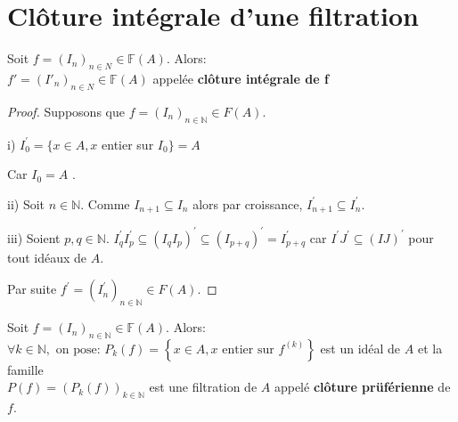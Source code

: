 \section{Clôture intégrale d'une filtration}
\begin{maproposition}
	Soit $f=(I_n)_{n \in N} \in \mathbb{F}(A).$ Alors:\\
	$f'=(I'_n)_{n \in N} \in \mathbb{F}(A)$ appelée \textbf{clôture intégrale de f}
\end{maproposition}
\begin{proof}
	Supposons que $f=(I_{n})_{n\in \mathbb{N}}\in F(A).$
	
	i) $I_{0}^{\prime }=\{x\in A,x$ entier sur $I_{0}\}=A$
	
	Car $I_{0}=A$ $.$
	
	ii) Soit $n\in \mathbb{N}.$
	Comme $I_{n+1}\subseteq I_{n}$ alors par croissance, $I_{n+1}^{\prime }\subseteq I_{n}^{\prime }.$
	
	iii) Soient $p,q\in \mathbb{N}.$
	$I_{q}^{\prime }I_{p}^{\prime }\subseteq (I_{q}I_{p})^{\prime }\subseteq
	(I_{p+q})^{\prime }=I_{p+q}^{\prime }$ car $I^{\prime }J^{\prime }\subseteq
	(IJ)^{\prime }$ pour tout idéaux de $A.$
	
	Par suite $f^{\prime }=(I_{n}^{\prime })_{n\in \mathbb{N}}\in F(A).$
\end{proof}
\begin{moncorollaire}
	Soit $f=(I_n)_{n \in \mathbb{N}} \in \mathbb{F}(A)$. Alors:\\
	$\forall k \in \mathbb{N}, \text{ on pose: } P_k(f)=\left\{x \in A, x \text{ entier sur } f^{(k)}\right\}$ est un idéal de $A$ et la famille \\ $P(f)=(P_k(f))_{k \in \mathbb{N}}$ est une filtration de $A$ appelé \textbf{clôture prüférienne} de $f$.
\end{moncorollaire}
